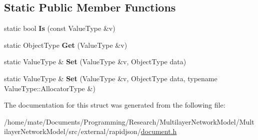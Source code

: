 \subsection*{Static Public Member Functions}
\begin{DoxyCompactItemize}
\item 
static bool {\bfseries Is} (const Value\+Type \&v)\hypertarget{structinternal_1_1TypeHelper_3_01ValueType_00_01typename_01ValueType_1_1Object_01_4_a6c8bcb7479d2c4c96ae6dcaac808e227}{}\label{structinternal_1_1TypeHelper_3_01ValueType_00_01typename_01ValueType_1_1Object_01_4_a6c8bcb7479d2c4c96ae6dcaac808e227}

\item 
static Object\+Type {\bfseries Get} (Value\+Type \&v)\hypertarget{structinternal_1_1TypeHelper_3_01ValueType_00_01typename_01ValueType_1_1Object_01_4_ae1debd6b9c125d4206e43a74ddbd0795}{}\label{structinternal_1_1TypeHelper_3_01ValueType_00_01typename_01ValueType_1_1Object_01_4_ae1debd6b9c125d4206e43a74ddbd0795}

\item 
static Value\+Type \& {\bfseries Set} (Value\+Type \&v, Object\+Type data)\hypertarget{structinternal_1_1TypeHelper_3_01ValueType_00_01typename_01ValueType_1_1Object_01_4_a7655ed9b6c7443d99063ec20769b9984}{}\label{structinternal_1_1TypeHelper_3_01ValueType_00_01typename_01ValueType_1_1Object_01_4_a7655ed9b6c7443d99063ec20769b9984}

\item 
static Value\+Type \& {\bfseries Set} (Value\+Type \&v, Object\+Type data, typename Value\+Type\+::\+Allocator\+Type \&)\hypertarget{structinternal_1_1TypeHelper_3_01ValueType_00_01typename_01ValueType_1_1Object_01_4_a41825b964c6188a07539b7ab2e6ed194}{}\label{structinternal_1_1TypeHelper_3_01ValueType_00_01typename_01ValueType_1_1Object_01_4_a41825b964c6188a07539b7ab2e6ed194}

\end{DoxyCompactItemize}


The documentation for this struct was generated from the following file\+:\begin{DoxyCompactItemize}
\item 
/home/mate/\+Documents/\+Programming/\+Research/\+Multilayer\+Network\+Model/\+Multilayer\+Network\+Model/src/external/rapidjson/\hyperlink{document_8h}{document.\+h}\end{DoxyCompactItemize}
